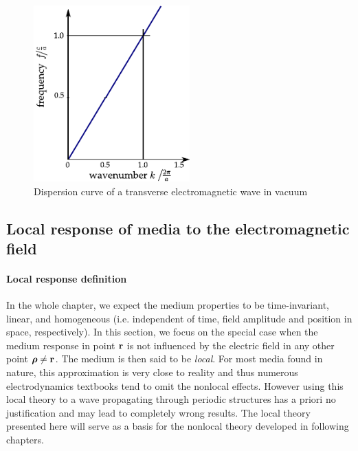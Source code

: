\begin{figure} \caption{Dispersion curve of a transverse electromagnetic wave in vacuum} \centering \includegraphics[width=6cm]{img/dispersion_curve_vacuum.pdf} \end{figure}

\subsection{Local response of media to the electromagnetic field} \label{loc_response_of_media}
\paragraph{Local response definition} \label{subsection_local_resp} %
In the whole chapter, we expect the medium properties to be time-invariant, linear, and homogeneous (i.e. independent of time, field amplitude and position in space, respectively). 
In this section, we focus on the special case when the medium response in point ${\mathbf{r}}$ is not influenced by the electric field in any other point $\boldsymbol{\rho} \neq {\mathbf{r}}$. The medium is then said to be \textit{local}. 
For most media found in nature, this approximation is very close to reality and thus numerous electrodynamics textbooks tend to omit the nonlocal effects. 
However using this local theory to a wave propagating through periodic structures has a priori no justification and may lead to completely wrong results. The local theory presented here will serve as a basis for the nonlocal theory developed in following chapters.

